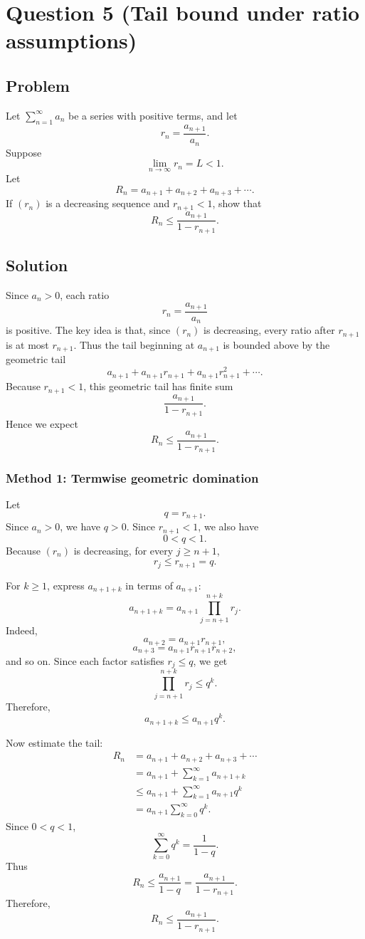 \documentclass[12pt]{article}
\begin{document}
\newpage
\section*{Question 5 (Tail bound under ratio assumptions)}

\subsection*{Problem}
Let \(\sum_{n=1}^\infty a_n\) be a series with positive terms, and let
\[
r_n=\frac{a_{n+1}}{a_n}.
\]
Suppose
\[
\lim_{n\to\infty}r_n=L<1.
\]
Let
\[
R_n=a_{n+1}+a_{n+2}+a_{n+3}+\cdots.
\]
If \((r_n)\) is a decreasing sequence and \(r_{n+1}<1\), show that
\[
R_n\le \frac{a_{n+1}}{1-r_{n+1}}.
\]

\subsection*{Solution}
Since \(a_n>0\), each ratio
\[
r_n=\frac{a_{n+1}}{a_n}
\]
is positive. The key idea is that, since \((r_n)\) is decreasing, every ratio after \(r_{n+1}\) is at most \(r_{n+1}\). Thus the tail beginning at \(a_{n+1}\) is bounded above by the geometric tail
\[
a_{n+1}+a_{n+1}r_{n+1}+a_{n+1}r_{n+1}^2+\cdots.
\]
Because \(r_{n+1}<1\), this geometric tail has finite sum
\[
\frac{a_{n+1}}{1-r_{n+1}}.
\]
Hence we expect
\[
\boxed{
R_n\le \frac{a_{n+1}}{1-r_{n+1}}.
}
\]

\newpage
\subsubsection*{Method 1: Termwise geometric domination}

Let
\[
q=r_{n+1}.
\]
Since \(a_n>0\), we have \(q>0\). Since \(r_{n+1}<1\), we also have
\[
0<q<1.
\]
Because \((r_n)\) is decreasing, for every \(j\ge n+1\),
\[
r_j\le r_{n+1}=q.
\]

For \(k\ge 1\), express \(a_{n+1+k}\) in terms of \(a_{n+1}\):
\[
a_{n+1+k}
=
a_{n+1}\prod_{j=n+1}^{n+k}r_j.
\]
Indeed,
\[
a_{n+2}=a_{n+1}r_{n+1},
\]
\[
a_{n+3}=a_{n+1}r_{n+1}r_{n+2},
\]
and so on. Since each factor satisfies \(r_j\le q\), we get
\[
\prod_{j=n+1}^{n+k}r_j
\le
q^k.
\]
Therefore,
\[
a_{n+1+k}\le a_{n+1}q^k.
\]

Now estimate the tail:
\begin{align*}
R_n
&=
a_{n+1}+a_{n+2}+a_{n+3}+\cdots\\
&=
a_{n+1}+\sum_{k=1}^{\infty}a_{n+1+k}\\
&\le
a_{n+1}+\sum_{k=1}^{\infty}a_{n+1}q^k\\
&=
a_{n+1}\sum_{k=0}^{\infty}q^k.
\end{align*}
Since \(0<q<1\),
\[
\sum_{k=0}^{\infty}q^k=\frac1{1-q}.
\]
Thus
\[
R_n
\le
\frac{a_{n+1}}{1-q}
=
\frac{a_{n+1}}{1-r_{n+1}}.
\]
Therefore,
\[
\boxed{
R_n\le \frac{a_{n+1}}{1-r_{n+1}}.
}
\]
\end{document}
